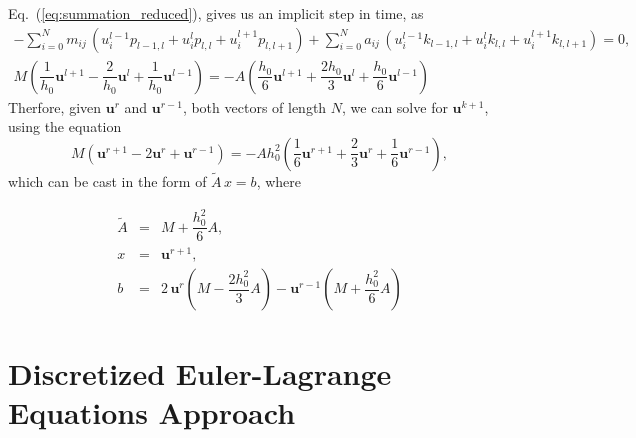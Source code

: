 \documentclass[nofootinbib,preprintnumbers,superscriptaddress,notitlepage]{revtex4-1}
\newcommand{\<}{\begin{equation}}
\newcommand{\?}{\end{equation}}
\begin{document}
Eq.~(\ref{eq:summation_reduced}), gives us an implicit step in time, as
\begin{eqnarray}
- \sum\limits_{i=0}^{N} m_{ij}\, \left(u_i^{l-1} p_{l-1, l} + u_i^{l} p_{l, l} + u_i^{l+1} p_{l, l+1} \right)
+ \sum\limits_{i=0}^{N} a_{ij}\, \left(u_i^{l-1} k_{l-1, l} + u_i^{l} k_{l, l} + u_i^{l+1} k_{l, l+1} \right) = 0, \\
M  \left( \dfrac{1}{h_0}\mathbf{u}^{l+1} -  \dfrac{2}{h_0}\mathbf{u}^{l} + \dfrac{1}{h_0}\mathbf{u}^{l-1} \right)
= - A \left( \dfrac{h_0}{6}\mathbf{u}^{l+1} +  \dfrac{2 h_0}{3}\mathbf{u}^{l} + \dfrac{h_0}{6}\mathbf{u}^{l-1} \right) 
\end{eqnarray}
Therfore, given $\mathbf{u}^r$ and $\mathbf{u}^{r-1}$, both vectors of length $N$, we can solve for $\mathbf{u}^{k+1}$, using the equation
\begin{equation}
M  \left(\mathbf{u}^{r+1} -  2\mathbf{u}^{r} + \mathbf{u}^{r-1} \right)
= - A h_0^2 \left( \dfrac{1}{6}\mathbf{u}^{r+1} +  \dfrac{2}{3}\mathbf{u}^{r} + \dfrac{1}{6}\mathbf{u}^{r-1} \right),
\end{equation}
which can be cast in the form of $\tilde{A}\, x = b$, where

\begin{eqnarray}
\tilde{A} &=& M + \dfrac{h_0^2}{6}A, \\
x &=& \mathbf{u}^{r+1}, \\
b &=& 2\,\mathbf{u}^{r}\left(M - \dfrac{2 h_0^2}{3}A\right) - \mathbf{u}^{r-1} \left(M + \dfrac{h_0^2}{6}A\right)
\end{eqnarray}

\section{Discretized Euler-Lagrange Equations Approach}
\end{document}
